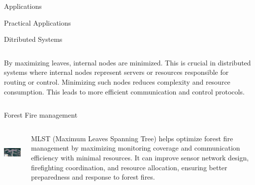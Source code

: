 \documentclass[xcolor=svgnames]{beamer}
\begin{document}
\begin{section}{Applications}
\begin{subsection}{Practical Applications}
\begin{frame}{Ditributed Systems}
\begin{columns}
\begin{column}{0.5\textwidth}
                By maximizing leaves, internal nodes are minimized. This is crucial in distributed systems where internal nodes represent servers or resources responsible for routing or control. Minimizing such nodes reduces complexity and resource consumption.\newline \newline
                This leads to more efficient communication and control protocols.\cite{PAYAN1984267}
            
                \end{column}
            
            \end{columns}

        \end{frame}
        \begin{frame}{Forest Fire management}
\begin{columns}

    \begin{column}{0.5\textwidth}
        \centering
        \includegraphics[height=2cm]{fire.png} %
        \end{column}    
        \begin{column}{0.5\textwidth}
        MLST (Maximum Leaves Spanning Tree) helps optimize forest fire management by maximizing monitoring coverage and communication efficiency with minimal resources. It can improve sensor network design, firefighting coordination, and resource allocation, ensuring better preparedness and response to forest fires.\cite{hosseinmardi2023new}
    
    
    
    
    
        \end{column}
    
    \end{columns}
     
\end{frame}
    

\end{subsection}
\end{section}
\end{document}
